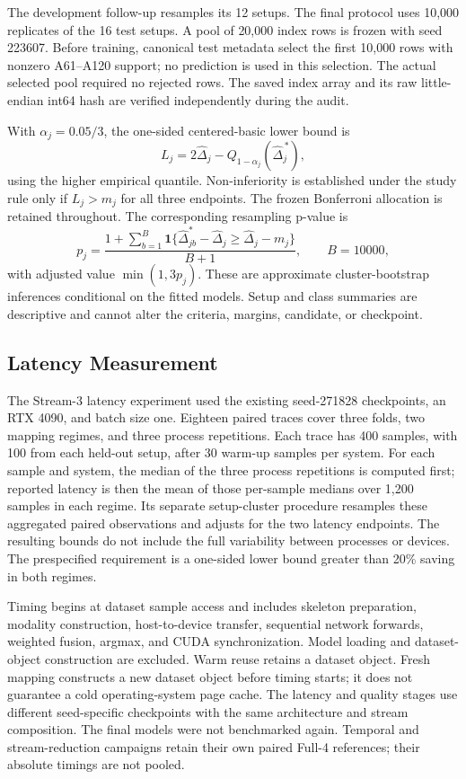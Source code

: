 \documentclass[ai,article,submit,moreauthors]{Definitions/mdpi}
\begin{document}
The development follow-up resamples its 12 setups. The final protocol uses
10,000 replicates of the 16 test setups. A pool of 20,000 index rows is
frozen with seed 223607. Before training, canonical test metadata select
the first 10,000 rows with nonzero A61--A120 support; no prediction is used
in this selection. The actual selected pool required no rejected rows.
The saved index array and its raw little-endian int64 hash are verified
independently during the audit.

With $\alpha_j=0.05/3$, the one-sided centered-basic lower bound is
\begin{equation}
 L_j=2\widehat\Delta_j-
 Q_{1-\alpha_j}\!\left(\widehat\Delta_j^{\,*}\right),
\end{equation}
using the higher empirical quantile. Non-inferiority is established under the study rule only if
$L_j>m_j$ for all three endpoints. The frozen Bonferroni allocation is
retained throughout. The corresponding resampling p-value is
\begin{equation}
 p_j=\frac{1+\sum_{b=1}^{B}
 \mathbf{1}\{\widehat\Delta_{jb}^{*}-\widehat\Delta_j
 \geq\widehat\Delta_j-m_j\}}{B+1},\qquad B=10000,
\end{equation}
with adjusted value $\min(1,3p_j)$. These are approximate cluster-bootstrap
inferences conditional on the fitted models. Setup and class summaries are
descriptive and cannot alter the criteria, margins, candidate, or checkpoint.

\subsection{Latency Measurement}

The Stream-3 latency experiment used the existing seed-271828 checkpoints,
an RTX 4090, and batch size one. Eighteen paired traces cover three folds,
two mapping regimes, and three process repetitions. Each trace has 400
samples, with 100 from each held-out setup, after 30 warm-up samples per
system. For each sample and system, the median of the three process repetitions is computed first; reported latency is then the mean of those per-sample medians over 1,200 samples in each regime. Its separate setup-cluster procedure resamples these aggregated paired observations and adjusts for the two latency
endpoints. The resulting bounds do not include the full variability between processes or devices. The prespecified requirement is a one-sided lower bound greater
than 20\% saving in both regimes.

Timing begins at dataset sample access and includes skeleton preparation,
modality construction, host-to-device transfer, sequential network forwards,
weighted fusion, argmax, and CUDA synchronization. Model loading and
dataset-object construction are excluded. Warm reuse retains a dataset
object. Fresh mapping constructs a new dataset object before timing starts;
it does not guarantee a cold operating-system page cache. The latency
and quality stages use different seed-specific checkpoints with the same
architecture and stream composition. The final models were not benchmarked
again. Temporal and stream-reduction campaigns retain their own paired
Full-4 references; their absolute timings are not pooled.
\end{document}

